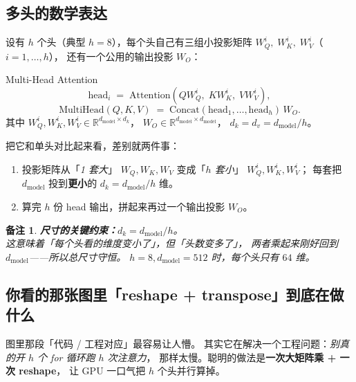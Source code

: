 \documentclass[11pt,a4paper]{ctexart}
\newtheorem{remark}{备注}
\newcommand{\R}{\mathbb{R}}
\begin{document}
\subsection{多头的数学表达}

设有 $h$ 个头（典型 $h = 8$），每个头自己有三组小投影矩阵
$W_Q^i,\; W_K^i,\; W_V^i$（$i = 1, \dots, h$），
还有一个公用的输出投影 $W_O$：

\begin{mathbox}{Multi-Head Attention}
\[
  \mathrm{head}_i \;=\; \mathrm{Attention}(Q W_Q^i,\; K W_K^i,\; V W_V^i),
\]
\[
  \mathrm{MultiHead}(Q, K, V) \;=\;
  \mathrm{Concat}(\mathrm{head}_1, \dots, \mathrm{head}_h)\, W_O.
\]
其中 $W_Q^i, W_K^i, W_V^i \in \R^{d_{\text{model}} \times d_k}$，
$W_O \in \R^{d_{\text{model}} \times d_{\text{model}}}$，
$d_k = d_v = d_{\text{model}} / h$。
\end{mathbox}

把它和单头对比起来看，差别就两件事：

\begin{enumerate}
  \item 投影矩阵从「\emph{1 套大}」 $W_Q, W_K, W_V$
        变成「\emph{$h$ 套小}」 $W_Q^i, W_K^i, W_V^i$；
        每套把 $d_{\text{model}}$ 投到\textbf{更小}的 $d_k = d_{\text{model}}/h$ 维。
  \item 算完 $h$ 份 head 输出，拼起来再过一个输出投影 $W_O$。
\end{enumerate}

\begin{remark}
\textbf{尺寸的关键约束：}$d_k = d_{\text{model}} / h$。\\
这意味着「每个头看的维度变小了」，但「头数变多了」，
两者乘起来\emph{刚好回到 $d_{\text{model}}$}——所以总尺寸守恒。
$h = 8, d_{\text{model}} = 512$ 时，每个头只有 $64$ 维。
\end{remark}

\subsection{你看的那张图里「reshape + transpose」到底在做什么}

图里那段「代码 / 工程对应」最容易让人懵。
其实它在解决一个工程问题：\emph{别真的开 $h$ 个 for 循环跑 $h$ 次注意力}，
那样太慢。聪明的做法是\textbf{一次大矩阵乘 + 一次 reshape}，
让 GPU 一口气把 $h$ 个头并行算掉。
\end{document}
